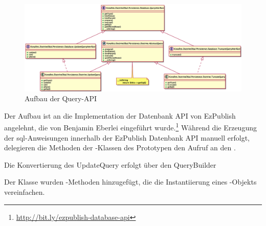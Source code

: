 \begin{figure}[H]
    \centering
    \includegraphics[scale=0.35]{gfx/uml/NewAPI/UpdateQuery.eps}
    \caption{Aufbau der Query-API}
    \label{fig:newQueryAPI}
\end{figure}

Der Aufbau ist an die Implementation der Datenbank API von EzPublish angelehnt, die von Benjamin Eberlei eingeführt wurde.\footnote{\url{http://bit.ly/ezpublish-database-api}} Während die Erzeugung der \gls{sql}-Anweisungen innerhalb der EzPublish Datenbank API manuell erfolgt, delegieren die Methoden der -Klassen des Prototypen den Aufruf an den .

\begin{listing}[H]
\caption{Die Konvertierung des UpdateQuery erfolgt über den QueryBuilder}
\label{lst:getSqlMethodOfUpdateQuery}
\end{listing}

Der Klasse \phpinline{\Konafets\DoctrineDbal\Persistence\Doctrine\DatabaseConnection} wurden -Methoden hinzugefügt, die die Instantiierung eines -Objekts vereinfachen.

